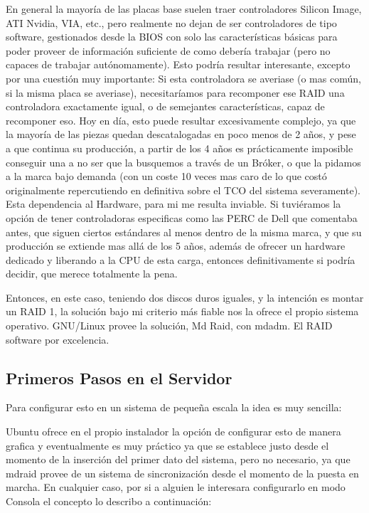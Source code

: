 En general la mayoría de las placas base suelen traer controladores Silicon Image, ATI Nvidia, VIA, etc., pero realmente no dejan de ser controladores de tipo software, gestionados desde la BIOS con solo las características básicas para poder proveer de información suficiente de como debería trabajar (pero no capaces de trabajar autónomamente). Esto podría resultar interesante, excepto por una cuestión muy importante: Si esta controladora se averiase (o mas común, si la misma placa se averiase), necesitaríamos para recomponer ese RAID una controladora exactamente igual, o de semejantes características, capaz de recomponer eso. Hoy en día, esto puede resultar excesivamente complejo, ya que la mayoría de las piezas quedan descatalogadas en poco menos de 2 años, y pese a que continua su producción, a partir de los 4 años es prácticamente imposible conseguir una a no ser que la busquemos a través de un Bróker, o que la pidamos a la marca bajo demanda (con un coste 10 veces mas caro de lo que costó originalmente repercutiendo en definitiva sobre el TCO del sistema severamente). Esta dependencia al Hardware, para mi me resulta inviable. Si tuviéramos la opción de tener controladoras especificas como las PERC de Dell que comentaba antes, que siguen ciertos estándares al menos dentro de la misma marca, y que su producción se extiende mas allá de los 5 años, además de ofrecer un hardware dedicado y liberando a la CPU de esta carga, entonces definitivamente si podría decidir, que merece totalmente la pena.

Entonces, en este caso, teniendo dos discos duros iguales, y la intención es montar un RAID 1, la solución bajo mi criterio más fiable nos la ofrece el propio sistema operativo. GNU/Linux provee la solución, Md Raid, con mdadm. El RAID software por excelencia.

\subsection{Primeros Pasos en el Servidor}

Para configurar esto en un sistema de pequeña escala la idea es muy sencilla:

Ubuntu ofrece en el propio instalador la opción de configurar esto de manera grafica y eventualmente es muy práctico ya que se establece justo desde el momento de la inserción del primer dato del sistema, pero no necesario, ya que mdraid provee de un sistema de sincronización desde el momento de la puesta en marcha. En cualquier caso, por si a alguien le interesara configurarlo en modo Consola el concepto lo describo a continuación:


